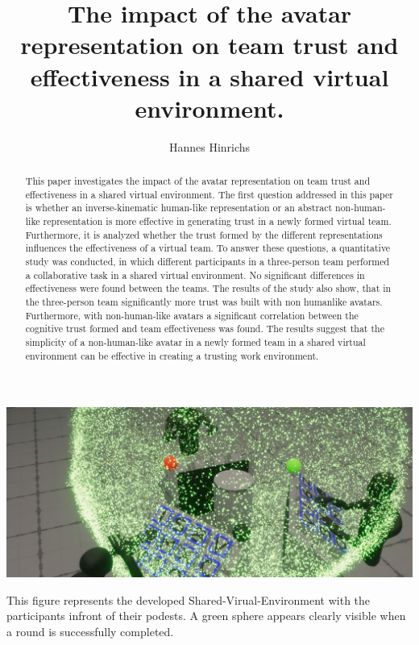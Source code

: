 \documentclass[sigchi]{acmart}
\begin{document}
\title{The impact of the avatar representation on team trust and effectiveness in a shared virtual environment.}

\author{Hannes Hinrichs}

\begin{abstract}
This paper investigates the impact of the avatar representation on team trust and effectiveness in a shared virtual environment. The first question addressed in this paper is whether an inverse-kinematic human-like representation or an abstract non-human-like representation is more effective in generating trust in a newly formed virtual team. Furthermore, it is analyzed whether the trust formed by the different representations influences the effectiveness of a virtual team. To answer these questions, a quantitative study was conducted, in which different participants in a three-person team performed a collaborative task in a shared virtual environment. No significant differences in effectiveness were found between the teams. The results of the study also show, that in the three-person team significantly more trust was built with non humanlike avatars. Furthermore, with non-human-like avatars a significant correlation between the cognitive trust formed and team effectiveness was found. The results suggest that the simplicity of a non-human-like avatar in a newly formed team in a shared virtual environment can be effective in creating a trusting work environment.
\end{abstract}


\begin{teaserfigure}
  \includegraphics[width=\textwidth]{Abbildungen/RoundSuccsessful2}
  \caption{This figure represents the developed Shared-Virual-Environment with the participants infront of their podests. A green sphere appears clearly visible when a round is successfully completed.}
  \label{fig:teaser}
\end{teaserfigure}
\end{document}
